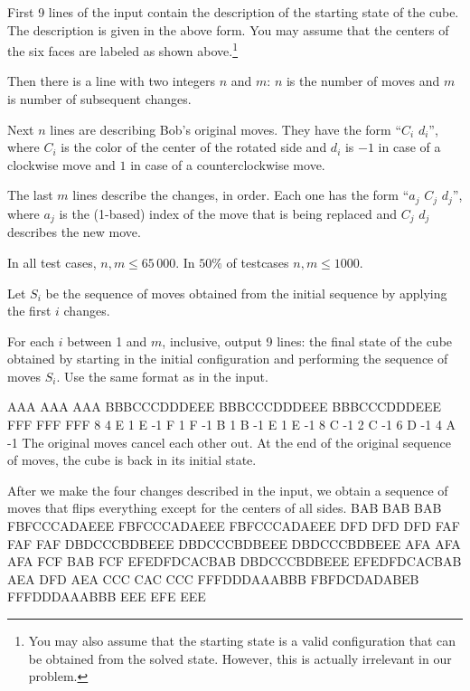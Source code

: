 
First 9 lines of the input contain the description of
the starting state of the cube. The description is given
in the above form. You may assume that the centers of the
six faces are labeled as shown above.\footnote{You may also assume
that the starting state is a valid configuration that can be obtained
from the solved state. However, this is actually irrelevant in our problem.}

Then there is a line with two integers $n$ and $m$:
$n$ is the number of moves and $m$ is number of subsequent changes.

Next $n$ lines are describing Bob's original moves.
They have the form ``$C_i$ $d_i$'',
where $C_i$ is the color of the center of the rotated side
and $d_i$ is $-1$ in case of a clockwise move
and $1$ in case of a counterclockwise move.

The last $m$ lines describe the changes, in order.
Each one has the form ``$a_j$ $C_j$ $d_j$'',
where $a_j$ is the (1-based) index of the move that
is being replaced and $C_j$ $d_j$ describes the
new move.


In all test cases, $n,m \leq 65\,000$. In $50\%$ of testcases $n,m \leq 1000$.

\newpage


Let $S_i$ be the sequence of moves obtained from the initial sequence
by applying the first $i$ changes.

For each $i$ between 1 and $m$, inclusive, output 9 lines: the final state
of the cube obtained by starting in the initial configuration and performing
the sequence of moves $S_i$. Use the same format as in the input.


\sampleIN
AAA
AAA
AAA
BBBCCCDDDEEE
BBBCCCDDDEEE
BBBCCCDDDEEE
FFF
FFF
FFF
8 4
E 1
E -1
F 1
F -1
B 1
B -1
E 1
E -1
8 C -1
2 C -1
6 D -1
4 A -1
\sampleCOMMENT
The original moves cancel each other out.
At the end of the original sequence of moves,
the cube is back in its initial state.

After we make the four changes described in the input,
we obtain a sequence of moves that flips everything
except for the centers of all sides.
\sampleOUT
BAB
BAB
BAB
FBFCCCADAEEE
FBFCCCADAEEE
FBFCCCADAEEE
DFD
DFD
DFD
FAF
FAF
FAF
DBDCCCBDBEEE
DBDCCCBDBEEE
DBDCCCBDBEEE
AFA
AFA
AFA
FCF
BAB
FCF
EFEDFDCACBAB
DBDCCCBDBEEE
EFEDFDCACBAB
AEA
DFD
AEA
CCC
CAC
CCC
FFFDDDAAABBB
FBFDCDADABEB
FFFDDDAAABBB
EEE
EFE
EEE
\sampleEND



